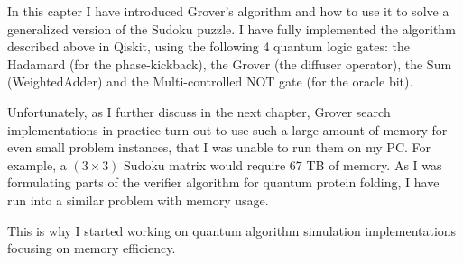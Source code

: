 In this capter I have introduced Grover's algorithm and how to use it to solve a generalized version of the Sudoku puzzle. I have fully implemented the algorithm described above in Qiskit, using the following 4 quantum logic gates: the Hadamard (for the phase-kickback), the Grover (the diffuser operator), the Sum (WeightedAdder) and the Multi-controlled NOT gate (for the oracle bit).

Unfortunately, as I further discuss in the next chapter, Grover search implementations in practice turn out to use such a large amount of memory for even small problem instances, that I was unable to run them on my PC. For example, a $(3 \times 3)$ Sudoku matrix would require $67$ TB of memory. As I was formulating parts of the verifier algorithm for quantum protein folding, I have run into a similar problem with memory usage.

This is why I started working on quantum algorithm simulation implementations focusing on memory efficiency.
